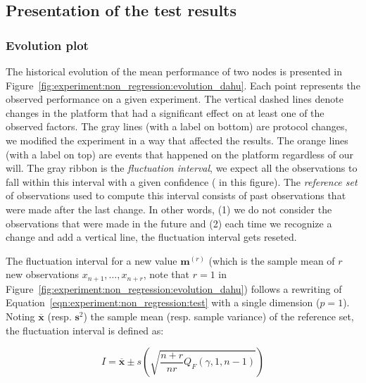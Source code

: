         \subsection{Presentation of the test results}%
        \label{sub:presentation_of_the_test_results}

            \subsubsection{Evolution plot}%

                The historical evolution of the mean performance of two nodes is presented in
                Figure~\ref{fig:experiment:non_regression:evolution_dahu}. Each point represents the observed
                performance on a given experiment. The vertical dashed lines denote changes in the platform that had a
                significant effect on at least one of the observed factors. The gray lines (with a label on bottom) are
                protocol changes, we modified the experiment in a way that affected the results. The orange lines (with
                a label on top) are events that happened on the platform regardless of our will.  The gray ribbon is the
                \emph{fluctuation interval}, we expect all the observations to fall within this interval with a given
                confidence ( in this figure). The \emph{reference set} of observations used to
                compute this interval consists of past observations that were made after the last change. In other
                words, (1) we do not consider the observations that were made in the future and (2) each time we
                recognize a change and add a vertical line, the fluctuation interval gets reseted.

                The fluctuation interval for a new value \(\bm{m}^{(r)}\) (which is the sample mean of \(r\) new
                observations \(x_{n+1},\dots,x_{n+r}\), note that \(r=1\) in
                Figure~\ref{fig:experiment:non_regression:evolution_dahu}) follows a rewriting of
                Equation~\ref{eqn:experiment:non_regression:test} with a single dimension (\(p=1\)). Noting
                \(\overline{\bm{x}}\) (resp. \(\bm{s}^2\)) the sample mean (resp. sample variance) of the reference set,
                the fluctuation interval is defined as:

                \begin{equation}\label{eqn:experiment:non_regression:interval}
                    I = \overline{\bm{x}} \pm s \left(\sqrt{\frac{n+r}{nr}Q_F(\gamma, 1, n-1)}\right)
                \end{equation}

